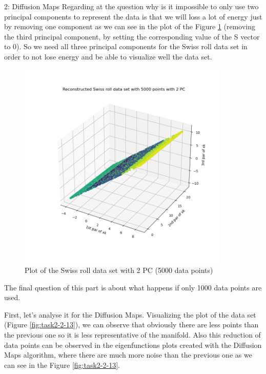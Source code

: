 \documentclass[10pt,a4paper]{article}
\begin{document}
\begin{task}{2: Diffusion Maps}
Regarding at the question why is it impossible to only use two principal components to represent the data is that we will loss a lot of energy just by removing one component as we can see in the plot of the Figure \ref{fig:task2-2-12} (removing the third principal component, by setting the corresponding value of the S vector to 0). So we need all three principal components for the Swiss roll data set in order to not lose energy and be able to visualize well the data set.

\begin{figure} [H]
    \centering
    \includegraphics[width=10cm]{images/Swiss_plot_2_PC.png}
    \caption{Plot of the Swiss roll data set with 2 PC (5000 data points)}
    \label{fig:task2-2-12}
\end{figure}

The final question of this part is about what happens if only 1000 data points are used. 

\noindent First, let's analyse it for the Diffusion Maps. Visualizing the plot of the data set (Figure \ref{fig:task2-2-13}), we can observe that obviously there are less points than the previous one so it is less representative of the manifold. Also this reduction of data points can be observed in the eigenfunctions plots created with the Diffusion Maps algorithm, where there are much more noise than the previous one as we can see in the Figure \ref{fig:task2-2-13}.


\end{task}
\end{document}
